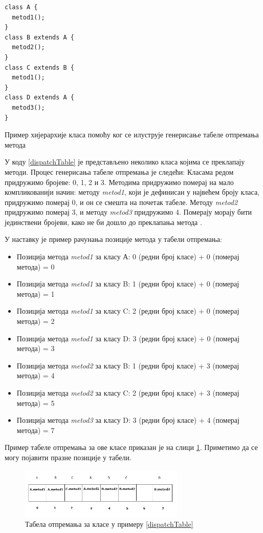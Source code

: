 \documentclass[12pt,oneside]{memoir}
\begin{document}
\begin{listing}
\begin{verbatim}
class A {
  metod1();
}
class B extends A {
  metod2();
}
class C extends B {
  metod1();
}
class D extends A {
  metod3();
}
\end{verbatim}
\caption{Пример хијерархије класа помоћу ког се илуструје генерисање табеле отпремања метода}
\label{dispatchTable}
\end{listing}

У коду \ref{dispatchTable} је представљено неколико класа којима се преклапају методи. Процес генерисања табеле отпремања је следећи: Класама редом придружимо бројеве: 0, 1, 2 и 3. Методима придружимо померај на мало компликованији начин: методу \textit{metod1}, који је дефинисан у највећем броју класа, придружимо померај 0, и он се смешта на почетак табеле. Методу \textit{metod2} придружимо померај 3, и методу \textit{metod3} придружимо 4. Померају морају бити јединствени бројеви, како не би дошло до преклапања метода \cite{Dartino}.

У наставку је пример рачунања позиције метода у табели отпремања:
\begin{itemize}
\item Позиција метода \textit{metod1} за класу А: 0 (редни број класе) + 0 (померај метода) = 0
\item Позиција метода \textit{metod1} за класу B: 1 (редни број класе) + 0 (померај метода) = 1
\item Позиција метода \textit{metod1} за класу C: 2 (редни број класе) + 0 (померај метода) = 2
\item Позиција метода \textit{metod1} за класу D: 3 (редни број класе) + 0 (померај метода) = 3
\item Позиција метода \textit{metod2} за класу B: 1 (редни број класе) + 3 (померај метода) = 4
\item Позиција метода \textit{metod2} за класу C: 2 (редни број класе) + 3 (померај метода) = 5
\item Позиција метода \textit{metod3} за класу D: 3 (редни број класе) + 4 (померај метода) = 7
\end{itemize}

Пример табеле отпремања за ове класе приказан је на слици \ref{fig:otpremanje}. Приметимо да се могу појавити празне позиције у табели.

\begin{figure}[!ht]
  \centering
  \includegraphics[width=0.7\textwidth]{otpremanje.jpg}
  \caption{Табела отпремања за класе у примеру \ref{dispatchTable}}
  \label{fig:otpremanje}
\end{figure}
\end{document}
